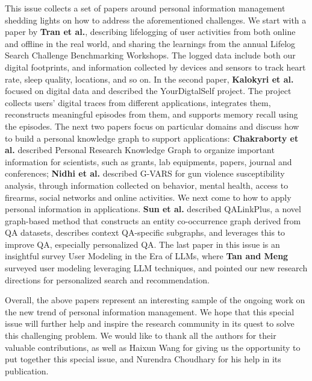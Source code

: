 \documentclass[11pt]{article}
\begin{document}
This issue collects a set of papers around personal information management shedding lights on how to address the aforementioned challenges. We start with a paper by {\bf Tran et al.}, describing lifelogging of user activities from both online and offline in the real world, and sharing the learnings from the annual Lifelog Search Challenge Benchmarking Workshops. The logged data include both our digital footprints, and information collected by devices and sensors to track heart rate, sleep quality, locations, and so on. In the second paper, {\bf Kalokyri et al.} focused on digital data and described the YourDigtalSelf project. The project collects users' digital traces from different applications, integrates them, reconstructs meaningful episodes from them, and supports memory recall using the episodes. The next two papers focus on particular domains and discuss how to build a personal knowledge graph to support applications: {\bf Chakraborty et al.} described Personal Research Knowledge Graph to organize important information for scientists, such as grants, lab equipments, papers, journal and conferences; {\bf Nidhi et al.} described G-VARS for gun violence susceptibility analysis, through information collected on behavior, mental health, access to firearms, social networks and online activities. We next come to how to apply personal information in applications. {\bf Sun et al.} described QALinkPlus, a novel graph-based method that constructs an entity co-occurrence graph derived from QA datasets, describes context QA-specific subgraphs, and leverages this to improve QA, especially personalized QA. The last paper in this issue is an insightful survey User Modeling in the Era of LLMs, where {\bf Tan and Meng} surveyed user modeling leveraging LLM techniques, and pointed our new research directions for personalized search and recommendation.

Overall, the above papers represent an interesting sample of the ongoing work on the new trend of personal information management. We hope that this special issue will further help and inspire the research community in its quest to solve this challenging problem. We would like to thank all the authors for their valuable contributions, as well as Haixun Wang for giving us the opportunity to put together this special issue, and Nurendra Choudhary for his help in its publication.
\end{document}
